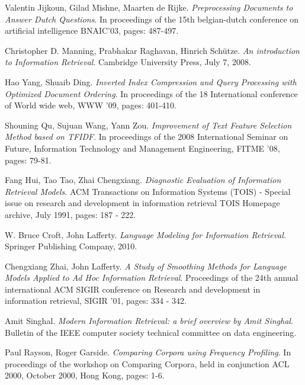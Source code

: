 \begin{thebibliography}{99}

		

			Valentin Jijkoun, Gilad Mishne, Maarten de Rijke.
			\emph{Preprocessing Documents to Answer Dutch Questions}.
			In proceedings of the 15th belgian-dutch conference on artificial intelligence
			BNAIC’03,
			pages: 487-497.

			Christopher D. Manning, Prabhakar Raghavan, Hinrich Schütze.
			\emph{An introduction to Information Retrieval}.
			Cambridge University Press,
			July 7, 2008.


			Hao Yang, Shuaib Ding.
			\emph{Inverted Index Compression and Query Processing with Optimized Document Ordering}.
			In proceedings of the 18 International conference of World wide web,
			WWW '09,
			pages: 401-410.

			Shouning Qu, Sujuan Wang, Yann Zou.
			\emph{Improvement of Text Feature Selection Method based on TFIDF}.
			In proceedings of the 2008 International Seminar on Future,
			Information Technology and Management Engineering,
			FITME '08,
			pages: 79-81.

			Fang Hui, Tao Tao, Zhai Chengxiang.
			\emph{Diagnostic Evaluation of Information Retrieval Models}.
			ACM Transactions on Information Systems (TOIS) -
			Special issue on research and development in information retrieval TOIS Homepage archive,
			July 1991,
			pages: 187 - 222.


			W. Bruce Croft, John Lafferty.
			\emph{Language Modeling for Information Retrieval}.
			Springer Publishing Company,
			2010.

			Chengxiang Zhai, John Lafferty.
			\emph{A Study of Smoothing Methods for Language Models Applied to Ad Hoc Information Retrieval}.
			Proceedings of the 24th annual international ACM SIGIR conference on Research and development in information retrieval,
			SIGIR '01,
			pages: 334 - 342.


			Amit Singhal.
			\emph{Modern Information Retrieval: a brief overview by Amit Singhal}.
			Bulletin of the IEEE computer society technical committee on data engineering.


			Paul Rayson, Roger Garside.
			\emph{Comparing Corpora using Frequency Profiling}.
			In proceedings of the workshop on Comparing Corpora, held in conjunction ACL 2000,
			October 2000, Hong Kong,
			pages: 1-6.


\end{thebibliography}
